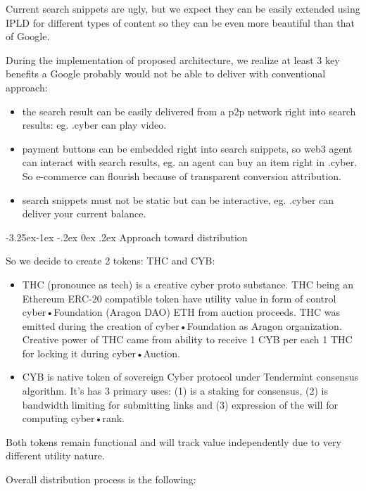 \documentclass[8pt,oneside]{amsart}
\makeatletter
\renewcommand\subsection{\@startsection{subsection}{2}{\z@}%
                                     {-3.25ex\@plus -1ex \@minus -.2ex}%
                                     {0ex \@plus .2ex}%
                                     {\play\Large}}%
\newcommand{\titleSection}[1]{\subsection{#1}}
\newcommand{\code}[1]{{\PlayBold #1}}
\makeatother
\begin{document}
Current search snippets are ugly, but we expect they can be easily extended using IPLD for different types of content so they can be even more beautiful than that of Google.

During the implementation of proposed architecture, we realize at least 3 key benefits a Google probably would not be able to deliver with conventional approach:

\begin{itemize}
\item the search result can be easily delivered from a p2p network right into search results: eg. .cyber can play video.
\item payment buttons can be embedded right into search snippets, so web3 agent can interact with search results, eg. an agent can buy an item right in \code{.cyber}. So e-commerce can flourish because of transparent conversion attribution.
\item search snippets must not be static but can be interactive, eg. \code{.cyber} can deliver your current balance.
\end{itemize}

\titleSection{Approach toward distribution}\label{Approach toward distribution}

So we decide to create 2 tokens: THC and CYB:

\begin{itemize}
\item THC (pronounce as tech) is a creative cyber proto substance. THC being an Ethereum ERC-20 compatible token have utility value in form of control cyber•Foundation (Aragon DAO) ETH from auction proceeds. THC was emitted during the creation of cyber•Foundation as Aragon organization. Creative power of THC came from ability to receive 1 CYB per each 1 THC for locking it during cyber•Auction.
\item CYB is native token of sovereign Cyber protocol under Tendermint consensus algorithm. It's has 3 primary uses: (1) is a staking for consensus, (2) is bandwidth limiting for submitting links and (3) expression of the will for computing cyber•rank.
\end{itemize}

Both tokens remain functional and will track value independently due to very different utility nature.

Overall distribution process is the following:
\end{document}
